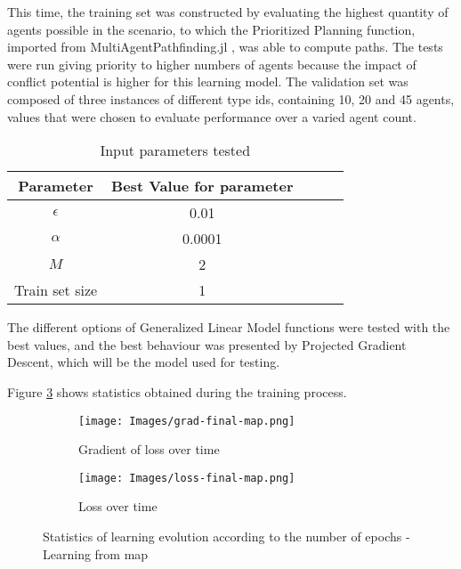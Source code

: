 This time, the training set was constructed by evaluating the highest quantity of agents possible in the scenario, to which the Prioritized Planning function, imported from MultiAgentPathfinding.jl \cite{dalleLearningCombinatorialOptimization2022}, was able to compute paths. The tests were run giving priority to higher numbers of agents because the impact of conflict potential is higher for this learning model. The validation set was composed of three instances of different type ids, containing 10, 20 and 45 agents, values that were chosen to evaluate performance over a varied agent count.

\begin{table}[!ht]
    \centering
    \caption{Input parameters tested}
    \begin{tabular}{|c|c|c|c|c|}
        \hline
        Parameter & Best Value for parameter \\
        \hline
        $\epsilon$ & 0.01 \\
        \hline
        $\alpha$ & 0.0001 \\
        \hline
        $M$ & 2 \\
        \hline
        Train set size & 1 \\
        \hline
    \end{tabular}
    \label{tab:params-map}
\end{table}

The different options of Generalized Linear Model functions were tested with the best values, and the best behaviour was presented by Projected Gradient Descent, which will be the model used for testing.

Figure \ref{fig:loss-graph} shows statistics obtained during the training process. 

\begin{figure}[!ht]
    \centering
    \begin{subfigure}[b]{0.45\textwidth}
        \texttt{[image: Images/grad-final-map.png]}
        \caption{Gradient of loss over time}
        \label{fig:grad-loss}
    \end{subfigure}
    \hspace{0.01\textwidth}
    \begin{subfigure}[b]{0.45\textwidth}
        \texttt{[image: Images/loss-final-map.png]}
        \caption{Loss over time}
        \label{fig:loss}
    \end{subfigure}    
    \caption{Statistics of learning evolution according to the number of epochs - Learning from map}
    \label{fig:loss-graph}
\end{figure}

